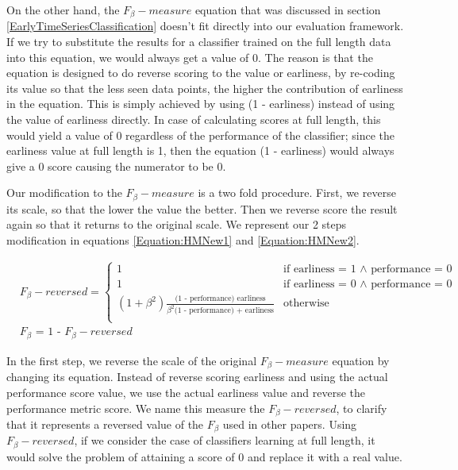 On the other hand, the $F_{\beta}-measure$ equation that was discussed in section \ref{EarlyTimeSeriesClassification} doesn't fit directly into our evaluation framework.
If we try to substitute the results for a classifier trained on the full length data into this equation, we would always get a value of 0.
The reason is that the equation is designed to do reverse scoring to the value or earliness, by re-coding its value so that the less seen data points, the higher the contribution of earliness in the equation.
This is simply achieved by using (1 - earliness) instead of using the value of earliness directly.
In case of calculating scores at full length, this would yield a value of 0 regardless of the performance of the classifier;
since the earliness value at full length is 1, then the equation (1 - earliness) would always give a 0 score causing the numerator to be 0.

Our modification to the $F_{\beta}-measure$ is a two fold procedure.
First, we reverse its scale, so that the lower the value the better. Then we reverse score the result again so that it returns to the original scale.
We represent our 2 steps modification in equations \ref{Equation:HMNew1} and \ref{Equation:HMNew2}.

\begin{align}
    & F_{\beta}-reversed =
        \begin{cases}
          1 & \text{if earliness = 1 $\land$ performance = 0} \\
          1 & \text{if earliness = 0 $\land$ performance = 0} \\
          (1 + \beta^2)\frac{\text{(1 - performance) earliness}}{\beta^2 \text{(1 - performance) + earliness}} & \text{otherwise} \\
        \end{cases} \label{Equation:HMNew1} \\
    & F_{\beta} \text{ = 1 - } F_{\beta}-reversed \label{Equation:HMNew2}
\end{align}

In the first step, we reverse the scale of the original $F_{\beta}-measure$ equation by changing its equation.
Instead of reverse scoring earliness and using the actual performance score value, we use the actual earliness value and reverse the performance metric score.
We name this measure the $F_{\beta}-reversed$, to clarify that it represents a reversed value of the $F_{\beta}$ used in other papers.
Using $F_{\beta}-reversed$, if we consider the case of classifiers learning at full length, 
it would solve the problem of attaining a score of 0 and replace it with a real value.

